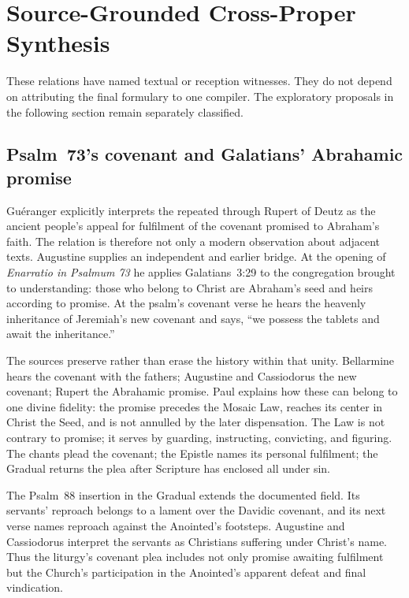 \sectionguard
\section*{Source-Grounded Cross-Proper Synthesis}

\begin{studyframe}
These relations have named textual or reception witnesses. They do not depend
on attributing the final formulary to one compiler. The exploratory proposals
in the following section remain separately classified.
\end{studyframe}

\subsection*{Psalm~73's covenant and Galatians' Abrahamic promise\enspace
  }

Guéranger explicitly interprets the repeated  through Rupert of
Deutz as the ancient people's appeal for fulfilment of the covenant promised to
Abraham's faith. The relation is therefore not only a modern observation about
adjacent texts. Augustine supplies an independent and earlier bridge. At the
opening of \emph{Enarratio in Psalmum 73} he applies Galatians~3:29 to the
congregation brought to understanding: those who belong to Christ are
Abraham's seed and heirs according to promise. At the psalm's covenant verse he
hears the heavenly inheritance of Jeremiah's new covenant and says, ``we
possess the tablets and await the inheritance.''

The sources preserve rather than erase the history within that unity.
Bellarmine hears the covenant with the fathers; Augustine and Cassiodorus the
new covenant; Rupert the Abrahamic promise. Paul explains how these can belong
to one divine fidelity: the promise precedes the Mosaic Law, reaches its center
in Christ the Seed, and is not annulled by the later dispensation. The Law is
not contrary to promise; it serves by guarding, instructing, convicting, and
figuring. The chants plead the covenant; the Epistle names its personal
fulfilment; the Gradual returns the plea after Scripture has enclosed all under
sin.

The Psalm~88 insertion in the Gradual extends the documented field. Its
servants' reproach belongs to a lament over the Davidic covenant, and its next
verse names reproach against the Anointed's footsteps. Augustine and
Cassiodorus interpret the servants as Christians suffering under Christ's
name. Thus the liturgy's covenant plea includes not only promise awaiting
fulfilment but the Church's participation in the Anointed's apparent defeat
and final vindication.


